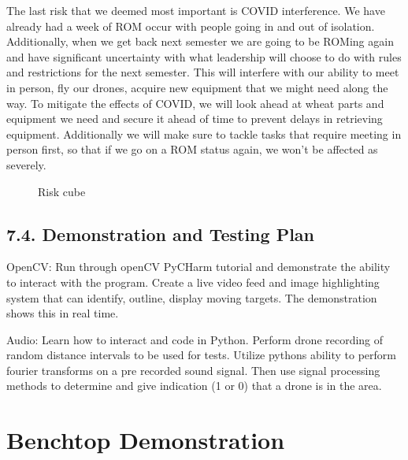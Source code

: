 \documentclass[10pt]{article}
\begin{document}
The last risk that we deemed most important is COVID interference.  We have already had a week of ROM occur with people going in and out of isolation.  Additionally, when we get back next semester we are going to be ROMing again and have significant uncertainty with what leadership will choose to do with rules and restrictions for the next semester.  This will interfere with our ability to meet in person, fly our drones, acquire new equipment that we might need along the way.  To mitigate the effects of COVID, we will look ahead at wheat parts and equipment we need and secure it ahead of time to prevent delays in retrieving equipment.  Additionally we will make sure to tackle tasks that require meeting in person first, so that if we go on a ROM status again, we won't be affected as severely.  
%
%
%
%
%
%
%
%
%
%
%

\begin{figure}
\caption{Risk cube}
\label{fig:risk}
\end{figure}


\subsection{7.4. Demonstration and Testing Plan}
OpenCV: Run through openCV PyCHarm tutorial and demonstrate the ability to interact with the program. Create a live video feed and image highlighting system that can identify, outline, display moving targets. The demonstration shows this in real time.  

Audio: Learn how to interact and code in Python. Perform drone recording of random distance intervals to be used for tests. Utilize pythons ability to perform fourier transforms on a pre recorded sound signal. Then use signal processing methods to determine and give indication (1 or 0) that a drone is in the area.

\section{Benchtop Demonstration}
\end{document}
